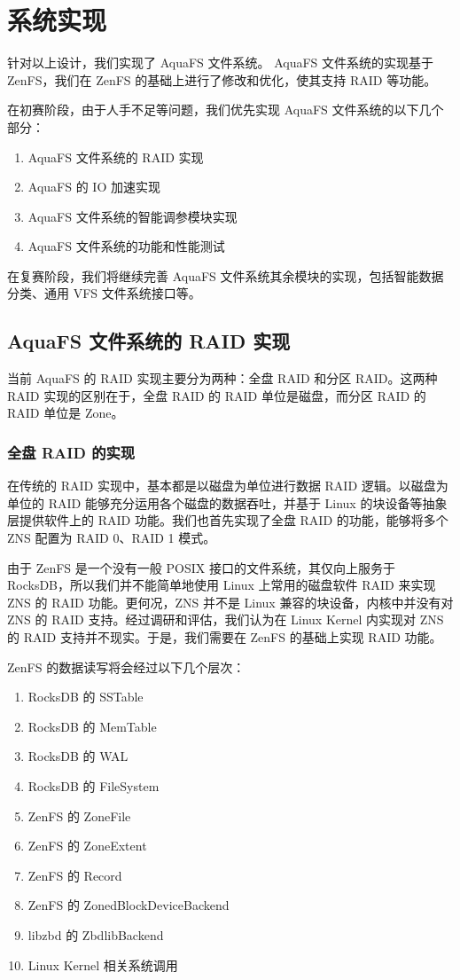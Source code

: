 \section{系统实现}

针对以上设计，我们实现了 AquaFS 文件系统。
AquaFS 文件系统的实现基于 ZenFS，我们在 ZenFS 的基础上进行了修改和优化，使其支持 RAID 等功能。

在初赛阶段，由于人手不足等问题，我们优先实现 AquaFS 文件系统的以下几个部分：

\begin{enumerate}
  \item AquaFS 文件系统的 RAID 实现
  \item AquaFS 的 IO 加速实现
  \item AquaFS 文件系统的智能调参模块实现
  \item AquaFS 文件系统的功能和性能测试
\end{enumerate}

在复赛阶段，我们将继续完善 AquaFS 文件系统其余模块的实现，包括智能数据分类、通用 VFS 文件系统接口等。

\subsection{AquaFS 文件系统的 RAID 实现}

当前 AquaFS 的 RAID 实现主要分为两种：全盘 RAID 和分区 RAID。这两种 RAID 实现的区别在于，全盘 RAID 的 RAID 单位是磁盘，而分区 RAID 的 RAID 单位是 Zone。

\subsubsection{全盘 RAID 的实现}

在传统的 RAID 实现中，基本都是以磁盘为单位进行数据 RAID 逻辑。以磁盘为单位的 RAID 能够充分运用各个磁盘的数据吞吐，并基于 Linux 的块设备等抽象层提供软件上的 RAID 功能。我们也首先实现了全盘 RAID 的功能，能够将多个 ZNS 配置为 RAID 0、RAID 1 模式。

由于 ZenFS 是一个没有一般 POSIX 接口的文件系统，其仅向上服务于 RocksDB，所以我们并不能简单地使用 Linux 上常用的磁盘软件 RAID 来实现 ZNS 的 RAID 功能。更何况，ZNS 并不是 Linux 兼容的块设备，内核中并没有对 ZNS 的 RAID 支持。经过调研和评估，我们认为在 Linux Kernel 内实现对 ZNS 的 RAID 支持并不现实。于是，我们需要在 ZenFS 的基础上实现 RAID 功能。

ZenFS 的数据读写将会经过以下几个层次：

\begin{enumerate}
  \item RocksDB 的 SSTable
  \item RocksDB 的 MemTable
  \item RocksDB 的 WAL
  \item RocksDB 的 FileSystem
  \item ZenFS 的 ZoneFile
  \item ZenFS 的 ZoneExtent
  \item ZenFS 的 Record
  \item ZenFS 的 ZonedBlockDeviceBackend
  \item libzbd 的 ZbdlibBackend
  \item Linux Kernel 相关系统调用
\end{enumerate}

